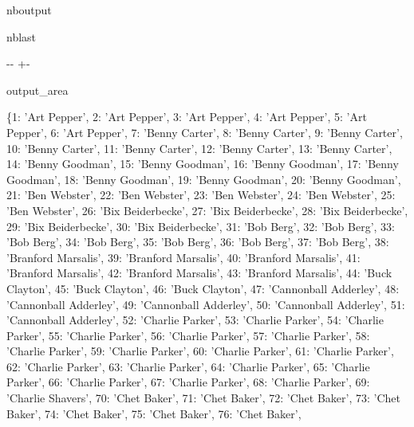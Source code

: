 \documentclass[letterpaper,10pt,english]{sphinxmanual}
\newlength\nbsphinxcodecellspacing
\begin{document}
\begin{sphinxuseclass}{nboutput}
\begin{sphinxuseclass}{nblast}
{

\kern-\sphinxverbatimsmallskipamount\kern-\baselineskip
\kern+\FrameHeightAdjust\kern-\fboxrule
\vspace{\nbsphinxcodecellspacing}

\begin{sphinxuseclass}{output_area}
\begin{sphinxuseclass}{}


\begin{sphinxVerbatim}[commandchars=\\\{\}]
\llap{\color{nbsphinxout}[26]:\,\hspace{\fboxrule}\hspace{\fboxsep}}\{1: 'Art Pepper',
 2: 'Art Pepper',
 3: 'Art Pepper',
 4: 'Art Pepper',
 5: 'Art Pepper',
 6: 'Art Pepper',
 7: 'Benny Carter',
 8: 'Benny Carter',
 9: 'Benny Carter',
 10: 'Benny Carter',
 11: 'Benny Carter',
 12: 'Benny Carter',
 13: 'Benny Carter',
 14: 'Benny Goodman',
 15: 'Benny Goodman',
 16: 'Benny Goodman',
 17: 'Benny Goodman',
 18: 'Benny Goodman',
 19: 'Benny Goodman',
 20: 'Benny Goodman',
 21: 'Ben Webster',
 22: 'Ben Webster',
 23: 'Ben Webster',
 24: 'Ben Webster',
 25: 'Ben Webster',
 26: 'Bix Beiderbecke',
 27: 'Bix Beiderbecke',
 28: 'Bix Beiderbecke',
 29: 'Bix Beiderbecke',
 30: 'Bix Beiderbecke',
 31: 'Bob Berg',
 32: 'Bob Berg',
 33: 'Bob Berg',
 34: 'Bob Berg',
 35: 'Bob Berg',
 36: 'Bob Berg',
 37: 'Bob Berg',
 38: 'Branford Marsalis',
 39: 'Branford Marsalis',
 40: 'Branford Marsalis',
 41: 'Branford Marsalis',
 42: 'Branford Marsalis',
 43: 'Branford Marsalis',
 44: 'Buck Clayton',
 45: 'Buck Clayton',
 46: 'Buck Clayton',
 47: 'Cannonball Adderley',
 48: 'Cannonball Adderley',
 49: 'Cannonball Adderley',
 50: 'Cannonball Adderley',
 51: 'Cannonball Adderley',
 52: 'Charlie Parker',
 53: 'Charlie Parker',
 54: 'Charlie Parker',
 55: 'Charlie Parker',
 56: 'Charlie Parker',
 57: 'Charlie Parker',
 58: 'Charlie Parker',
 59: 'Charlie Parker',
 60: 'Charlie Parker',
 61: 'Charlie Parker',
 62: 'Charlie Parker',
 63: 'Charlie Parker',
 64: 'Charlie Parker',
 65: 'Charlie Parker',
 66: 'Charlie Parker',
 67: 'Charlie Parker',
 68: 'Charlie Parker',
 69: 'Charlie Shavers',
 70: 'Chet Baker',
 71: 'Chet Baker',
 72: 'Chet Baker',
 73: 'Chet Baker',
 74: 'Chet Baker',
 75: 'Chet Baker',
 76: 'Chet Baker',

\end{sphinxVerbatim}
\end{sphinxuseclass}
\end{sphinxuseclass}}
\end{sphinxuseclass}
\end{sphinxuseclass}
\end{document}
